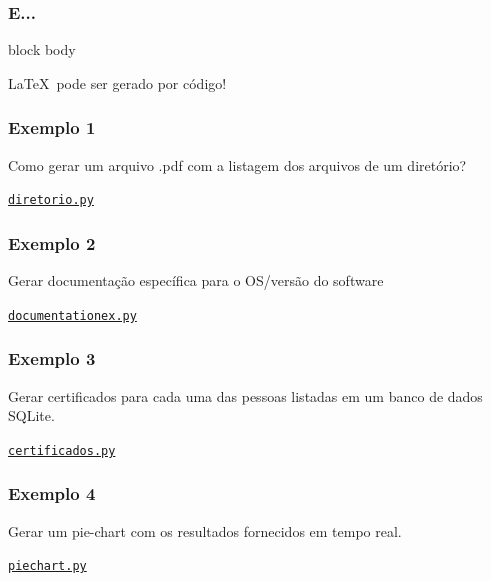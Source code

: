 \documentclass{beamer}
\begin{document}
\begin{frame}
   \frametitle{E...}
      \begin{center}
         \begin{minipage}{6cm}
         \begin{beamercolorbox}[sep=1em]{block body}
           \begin{center}
             \LaTeX\ pode ser gerado por código!
           \end{center}
         \end{beamercolorbox}
         \end{minipage}
      \end{center}
\end{frame}
\begin{frame}
   \frametitle{Exemplo 1}
   Como gerar um arquivo .pdf com a listagem dos arquivos de um diretório?
   \begin{center}
      \href{exemplos_codigo/listar_diretorio/diretorio.py}{\tt{diretorio.py}}
   \end{center}
\end{frame}
\begin{frame}
   \frametitle{Exemplo 2}
   Gerar documentação específica para o OS/versão do software
   \begin{center}
      \href{exemplos_codigo/documentationex/documentationex.py}{\tt{documentationex.py}}
   \end{center}
\end{frame}
\begin{frame}
   \frametitle{Exemplo 3}
   Gerar certificados para cada uma das pessoas listadas em um banco de dados SQLite.
   \begin{center}
      \href{exemplos_codigo/certificados/certificados.py}{\tt{certificados.py}}
   \end{center}
\end{frame}
\begin{frame}
   \frametitle{Exemplo 4}
   Gerar um pie-chart com os resultados fornecidos em tempo real.
   \begin{center}
      \href{exemplos_codigo/piechart/piechart.py}{\tt{piechart.py}}
   \end{center}
\end{frame}
\end{document}
